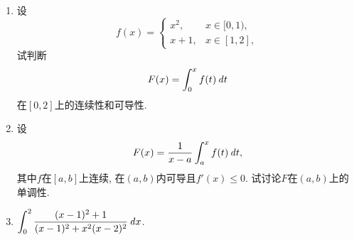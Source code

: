 \documentclass[a4paper,punct=CCT]{ctexbook}
\theoremstyle{break}
\newif\ifshowsol
\let\leq\leqslant
\let\le\leq
\begin{document}
\begin{enumerate}
\item 设
  \[
    f(x) =
    \begin{cases}
      x^2, & x \in [0,1), \\
      x+1, & x \in [1,2],
    \end{cases}
  \]
  试判断
  \[
    F(x) = \int_0^x f(t) \mathop{}\!\mathit{d} t
  \]
  在\([0,2]\)上的连续性和可导性.

  \ifshowsol
  对于这个简单的函数, 我们可以写出它的表达式
  \[
    F(x) =
    \begin{cases}
      \frac13 x^3, & x \in [0,1), \\
      \frac12 x^2 + x - \frac76, & x \in [1,2].
    \end{cases}
  \]
  所以易知\(\lim_{x\to1} F(x) = F(1) = \frac13\)和\(F'_-(1) = 1 \ne 2 = F'_+(1)\).  那么\(F\)在\([0,2]\)上连续, 导函数在\(x=1\)处存在第一类间断点.
  \fi

\item 设
  \[
    F(x) = \frac1{x-a} \int_a^x f(t) \mathop{}\!\mathit{d} t,
  \]
  其中\(f\)在\([a,b]\)上连续, 在\((a,b)\)内可导且\(f'(x) \le 0\).  试讨论\(F\)在\((a,b)\)上的单调性.

  \ifshowsol
  对该函数求导, 得到
  \[
    \ddx F(x) = \frac{f(x)(x-a) - \int_a^x f(t) \dt}{(x-a)^2}.
  \]
  因为\(f\)在\((a,b)\)上单调递减, 所以
  \[
    f(x)(x-a) \le \int_a^x f(t) \dt.
  \]
  这就意味着\(\ddx F(x) \le 0\), 也就是说\(F\)在\((a,b)\)上单调递减.
  \fi

\item \(\displaystyle \int_0^2 \frac{(x-1)^2 + 1}{(x-1)^2 + x^2 (x-2)^2} \mathop{}\!\mathit{d} x\).

  \ifshowsol
  设被积函数为\(f\,\), 那么根据定积分的性质就有
  \[
    \begin{split}
      \int_0^2 f(x) \dx
      &= \int_{-1}^1 f(x+1) \dx
      = \int_{-1}^1 \frac{x^2 + 1}{x^2 + (x+1)^2 (x-1)^2} \dx \\
      &= 2 \int_0^1 \frac{x^2 + 1}{x^2 + (x+1)^2 (x-1)^2} \dx
      = 2 \int_0^1 \frac{1 + \frac{1}{x^2}}{1 + \paren[\big]{\frac{x^2-1}{x}}^2} \dx \\
      &= 2 \int_0^1 \frac{1 + \frac{1}{x^2}}{1 + \paren[\big]{x - \frac{1}{x}}^2} \dx
      = 2 \int_0^1 \frac{\diff\paren[\big]{x - \frac{1}{x}}}{1 + \paren[\big]{x - \frac{1}{x}}^2} \\
      &= 2 \arctan\paren[\Big]{x - \frac{1}{x}}\bigg\vert_0^1
      = 2 \brkt[\Big]{0 - \paren[\Big]{-\frac{\pi}{2}}} \\
      &= \pi.
    \end{split}
  \]
  易知平移后的函数\(f(x+1)\)是一个偶函数.
  \fi


\end{enumerate}
\end{document}
